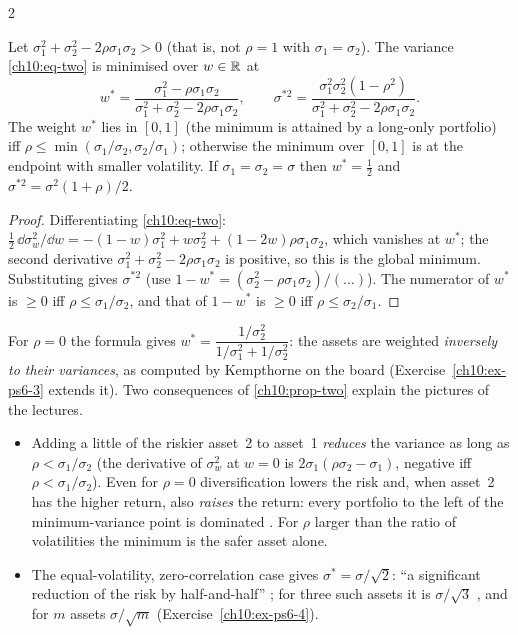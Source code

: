 \begin{paracol}{2}
\begin{proposition}\label{ch10:prop-two}
Let $\sigma_1^2+\sigma_2^2-2\rho\sigma_1\sigma_2>0$ (that is, not $\rho=1$ with $\sigma_1=\sigma_2$). The variance
\eqref{ch10:eq-two} is minimised over $w\in\mathbb{R}$ at
\[
  w^*=\frac{\sigma_1^2-\rho\sigma_1\sigma_2}{\sigma_1^2+\sigma_2^2-2\rho\sigma_1\sigma_2},\qquad
  \sigma^{*2}=\frac{\sigma_1^2\sigma_2^2(1-\rho^2)}{\sigma_1^2+\sigma_2^2-2\rho\sigma_1\sigma_2}.
\]
The weight $w^*$ lies in $[0,1]$ (the minimum is attained by a long-only portfolio) iff
$\rho\le\min(\sigma_1/\sigma_2,\sigma_2/\sigma_1)$; otherwise the minimum over $[0,1]$ is at the endpoint with smaller
volatility. If $\sigma_1=\sigma_2=\sigma$ then $w^*=\tfrac12$ and $\sigma^{*2}=\sigma^2(1+\rho)/2$.
\end{proposition}
\begin{proof}
Differentiating \eqref{ch10:eq-two}: $\tfrac12\,\dd\sigma_w^2/\dd w=-(1-w)\sigma_1^2+w\sigma_2^2+(1-2w)\rho\sigma_1\sigma_2$,
which vanishes at $w^*$; the second derivative $\sigma_1^2+\sigma_2^2-2\rho\sigma_1\sigma_2$ is positive, so this is the
global minimum. Substituting gives $\sigma^{*2}$ (use $1-w^*=(\sigma_2^2-\rho\sigma_1\sigma_2)/(\dots)$).
The numerator of $w^*$ is $\ge0$ iff $\rho\le\sigma_1/\sigma_2$, and that of $1-w^*$ is $\ge0$ iff
$\rho\le\sigma_2/\sigma_1$.
\end{proof}
For $\rho=0$ the formula gives $w^*=\dfrac{1/\sigma_2^2}{1/\sigma_1^2+1/\sigma_2^2}$: the assets are weighted
\emph{inversely to their variances}, as computed by Kempthorne on the board 
(Exercise~\ref{ch10:ex-ps6-3} extends it).
Two consequences of \cref{ch10:prop-two} explain the pictures of the lectures.
\begin{itemize}
  \item Adding a little of the riskier
      asset~2 to asset~1 \emph{reduces} the variance as long as $\rho<\sigma_1/\sigma_2$
      (the derivative of $\sigma_w^2$ at $w=0$ is $2\sigma_1(\rho\sigma_2-\sigma_1)$, negative iff $\rho<\sigma_1/\sigma_2$). Even for $\rho=0$ diversification lowers the risk and, when asset~2 has the higher return,
      also \emph{raises} the return: every portfolio to the left of the minimum-variance point is dominated
      . For $\rho$ larger than the ratio of volatilities the minimum is the safer asset alone.
  \item The equal-volatility, zero-correlation case gives $\sigma^*=\sigma/\sqrt2$: ``a significant reduction of
      the risk by half-and-half'' ; for three such assets it is $\sigma/\sqrt3$
      , and for $m$ assets $\sigma/\sqrt m$ (Exercise~\ref{ch10:ex-ps6-4}).
\end{itemize}


\end{paracol}
